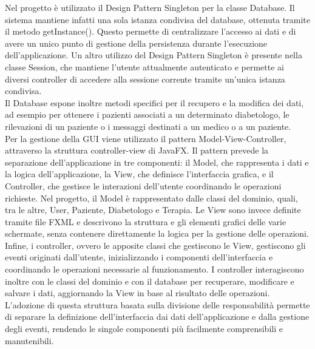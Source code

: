 Nel progetto è utilizzato il Design Pattern Singleton per la classe Database. Il sistema mantiene infatti una sola istanza condivisa del database, ottenuta tramite il metodo getInstance(). Questo permette di centralizzare l'accesso ai dati e di avere un unico punto di gestione della persistenza durante l'esecuzione dell'applicazione. Un altro utilizzo del Design Pattern Singleton è presente nella classe Session, che mantiene l'utente attualmente autenticato e permette ai diversi controller di accedere alla sessione corrente tramite un'unica istanza condivisa.\\
Il Database espone inoltre metodi specifici per il recupero e la modifica dei dati, ad esempio per ottenere i pazienti associati a un determinato diabetologo, le rilevazioni di un paziente o i messaggi destinati a un medico o a un paziente.\\
Per la gestione della GUI viene utilizzato il pattern Model-View-Controller, attraverso la struttura controller-view di JavaFX. Il pattern prevede la separazione dell'applicazione in tre componenti: il Model, che rappresenta i dati e la logica dell'applicazione, la View, che definisce l'interfaccia grafica, e il Controller, che gestisce le interazioni dell'utente coordinando le operazioni richieste. Nel progetto, il Model è rappresentato dalle classi del dominio, quali, tra le altre, User, Paziente, Diabetologo e Terapia. Le View sono invece definite tramite file FXML e descrivono la struttura e gli elementi grafici delle varie schermate, senza contenere direttamente la logica per la gestione delle operazioni. Infine, i controller, ovvero le apposite classi che gestiscono le View, gestiscono gli eventi originati dall'utente, inizializzando i componenti dell'interfaccia e coordinando le operazioni necessarie al funzionamento. I controller interagiscono inoltre con le classi del dominio e con il database per recuperare, modificare e salvare i dati, aggiornando la View in base al risultato delle operazioni.\\
L'adozione di questa struttura basata sulla divisione delle responsabilità permette di separare la definizione dell'interfaccia dai dati dell'applicazione e dalla gestione degli eventi, rendendo le singole componenti più facilmente comprensibili e manutenibili.
